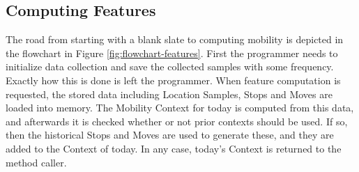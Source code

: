 \subsection{Computing Features}
The road from starting with a blank slate to computing mobility is depicted in the flowchart in Figure \ref{fig:flowchart-features}. First the programmer needs to initialize data collection and save the collected samples with some frequency. Exactly how this is done is left the programmer. When feature computation is requested, the stored data including Location Samples, Stops and Moves are loaded into memory. The Mobility Context for today is computed from this data, and afterwards it is checked whether or not prior contexts should be used. If so, then the historical Stops and Moves are used to generate these, and they are added to the Context of today. In any case, today's Context is returned to the method caller.

